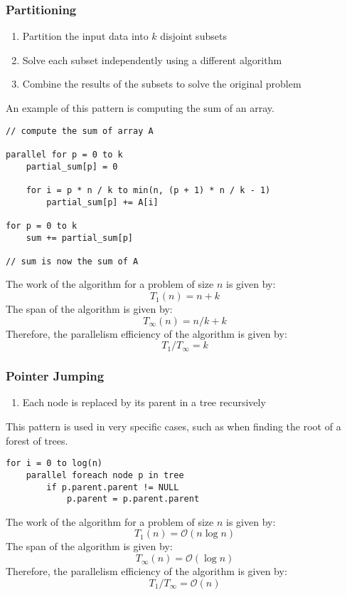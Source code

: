 \documentclass{article}
\begin{document}
\subsubsection{Partitioning}
\begin{enumerate}
    \item Partition the input data into \(k\) disjoint subsets
    \item Solve each subset independently using a different algorithm
    \item Combine the results of the subsets to solve the original
          problem
\end{enumerate}
An example of this pattern is computing the sum of an array.
\begin{verbatim}
// compute the sum of array A

parallel for p = 0 to k
    partial_sum[p] = 0

    for i = p * n / k to min(n, (p + 1) * n / k - 1)
        partial_sum[p] += A[i]

for p = 0 to k
    sum += partial_sum[p]

// sum is now the sum of A
\end{verbatim}
The work of the algorithm for a problem of size \(n\) is given by:
\begin{equation*}
    T_1\left( n \right) = n + k
\end{equation*}
The span of the algorithm is given by:
\begin{equation*}
    T_\infty\left( n \right) = n/k + k
\end{equation*}
Therefore, the parallelism efficiency of the algorithm is given by:
\begin{equation*}
    T_1 / T_\infty = k
\end{equation*}
\subsubsection{Pointer Jumping}
\begin{enumerate}
    \item Each node is replaced by its parent in a tree recursively
\end{enumerate}
This pattern is used in very specific cases, such as when finding the
root of a forest of trees.
\begin{verbatim}
for i = 0 to log(n)
    parallel foreach node p in tree
        if p.parent.parent != NULL
            p.parent = p.parent.parent
\end{verbatim}
The work of the algorithm for a problem of size \(n\) is given by:
\begin{equation*}
    T_1\left( n \right) = \mathcal{O}\left( n \log n \right)
\end{equation*}
The span of the algorithm is given by:
\begin{equation*}
    T_\infty\left( n \right) = \mathcal{O}\left( \log n \right)
\end{equation*}
Therefore, the parallelism efficiency of the algorithm is given by:
\begin{equation*}
    T_1 / T_\infty = \mathcal{O}\left( n \right)
\end{equation*}
\end{document}
